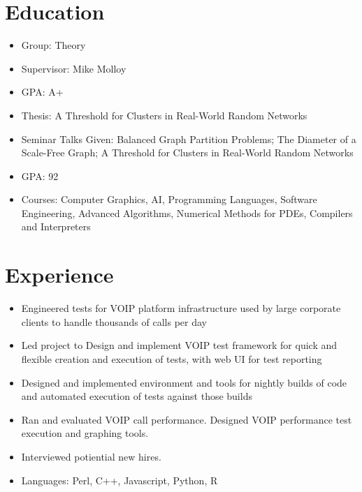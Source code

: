 \documentclass[11pt,a4paper]{moderncv}
\begin{document}
\maketitle
\section{\textbf{Education}}

{ \begin{itemize} \itemsep -2pt
  \item Group: Theory\item Supervisor: Mike Molloy\item GPA: A+ \item Thesis: A Threshold for Clusters in Real-World Random Networks\item Seminar Talks Given: Balanced Graph Partition Problems; The Diameter of a Scale-Free Graph; A Threshold for Clusters in Real-World Random Networks
\end{itemize} }
  
{ \begin{itemize} \itemsep -2pt
  \item GPA: 92\item Courses: Computer Graphics, AI, Programming Languages, Software Engineering, Advanced Algorithms, Numerical Methods for PDEs, Compilers and Interpreters 
\end{itemize} }
  


\section{\textbf{Experience}}

{ \begin{itemize} \itemsep -2pt
  \item Engineered tests for VOIP platform infrastructure used by large corporate clients to handle thousands of calls per day\item Led project to Design and implement VOIP test framework for quick and flexible creation and execution of tests, with web UI for test reporting\item Designed and implemented environment and tools for nightly builds of code and automated execution of tests against those builds\item Ran and evaluated VOIP call performance. Designed VOIP performance test execution and graphing tools.\item Interviewed potiential new hires.\item Languages: Perl, C++, Javascript, Python, R
\end{itemize} }
  
\end{document}
